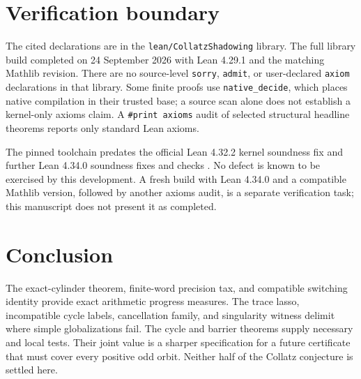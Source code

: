 \documentclass[11pt,a4paper]{article}
\theoremstyle{definition}
\begin{document}
\section{Verification boundary}

The cited declarations are in the \texttt{lean/CollatzShadowing} library.
The full library build completed on 24 September 2026 with Lean 4.29.1
and the matching Mathlib revision.
There are no source-level \texttt{sorry}, \texttt{admit}, or
user-declared \texttt{axiom} declarations in that library. Some finite
proofs use \texttt{native\_decide}, which places native compilation in
their trusted base; a source scan alone does not establish a kernel-only
axioms claim. A \texttt{\#print axioms} audit of selected structural
headline theorems reports only standard Lean axioms.

The pinned toolchain predates the official Lean 4.32.2 kernel soundness
fix \cite{lean4322} and further Lean 4.34.0 soundness fixes and checks
\cite{lean4340}. No defect is known to be exercised by this development.
A fresh build with Lean 4.34.0 and a compatible Mathlib version, followed
by another axioms audit, is a separate verification task; this manuscript
does not present it as completed.

\section{Conclusion}

The exact-cylinder theorem, finite-word precision tax, and compatible
switching identity provide
exact arithmetic progress measures. The trace lasso, incompatible cycle
labels, cancellation family, and singularity witness delimit where simple
globalizations fail. The cycle and barrier theorems supply necessary and
local tests.
Their joint value is a sharper specification for a future certificate
that must cover every positive odd orbit. Neither half of the Collatz
conjecture is settled here.
\end{document}

